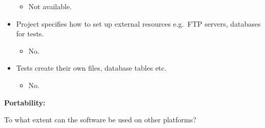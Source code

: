 \begin{itemize}
  \begin{itemize}
  \itemsep1pt\parskip0pt
  \item
    Not available.
  \end{itemize}
\item
  Project specifies how to set up external resources e.g.~FTP servers,
  databases for tests.

  \begin{itemize}
  \itemsep1pt\parskip0pt
  \item
    No.
  \end{itemize}
\item
  Tests create their own files, database tables etc.

  \begin{itemize}
  \itemsep1pt\parskip0pt
  \item
    No.
  \end{itemize}
\end{itemize}

\textbf{Portability:}

To what extent can the software be used on other platforms?

